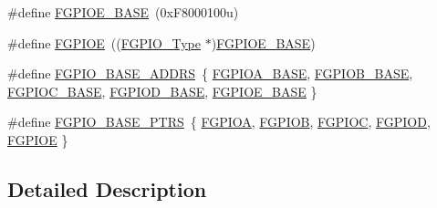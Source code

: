 \begin{DoxyCompactItemize}
\item 
\#define \mbox{\hyperlink{group___f_g_p_i_o___peripheral___access___layer_ga2de7ad1c5fbb15d6ffaecdc3b4653774}{F\+G\+P\+I\+O\+E\+\_\+\+B\+A\+SE}}~(0x\+F8000100u)
\item 
\#define \mbox{\hyperlink{group___f_g_p_i_o___peripheral___access___layer_ga3692c54389ee20cfac5582c942daffc9}{F\+G\+P\+I\+OE}}~((\mbox{\hyperlink{struct_f_g_p_i_o___type}{F\+G\+P\+I\+O\+\_\+\+Type}} $\ast$)\mbox{\hyperlink{group___f_g_p_i_o___peripheral___access___layer_ga2de7ad1c5fbb15d6ffaecdc3b4653774}{F\+G\+P\+I\+O\+E\+\_\+\+B\+A\+SE}})
\item 
\#define \mbox{\hyperlink{group___f_g_p_i_o___peripheral___access___layer_ga4bd60cd4bdf238ff321195acb421b187}{F\+G\+P\+I\+O\+\_\+\+B\+A\+S\+E\+\_\+\+A\+D\+D\+RS}}~\{ \mbox{\hyperlink{group___f_g_p_i_o___peripheral___access___layer_ga5be504106abad77cbd9d7d05bce089bb}{F\+G\+P\+I\+O\+A\+\_\+\+B\+A\+SE}}, \mbox{\hyperlink{group___f_g_p_i_o___peripheral___access___layer_gae82f132d064f5a999cb0191619628cd4}{F\+G\+P\+I\+O\+B\+\_\+\+B\+A\+SE}}, \mbox{\hyperlink{group___f_g_p_i_o___peripheral___access___layer_ga5a8489a84c23b5ff6aae4e0d3048c861}{F\+G\+P\+I\+O\+C\+\_\+\+B\+A\+SE}}, \mbox{\hyperlink{group___f_g_p_i_o___peripheral___access___layer_ga5b3caca7e9c439b235d8390e79731b88}{F\+G\+P\+I\+O\+D\+\_\+\+B\+A\+SE}}, \mbox{\hyperlink{group___f_g_p_i_o___peripheral___access___layer_ga2de7ad1c5fbb15d6ffaecdc3b4653774}{F\+G\+P\+I\+O\+E\+\_\+\+B\+A\+SE}} \}
\item 
\#define \mbox{\hyperlink{group___f_g_p_i_o___peripheral___access___layer_ga58956e4d0a0ffec3e1dd70e77a5160b4}{F\+G\+P\+I\+O\+\_\+\+B\+A\+S\+E\+\_\+\+P\+T\+RS}}~\{ \mbox{\hyperlink{group___f_g_p_i_o___peripheral___access___layer_gae9c9828758a8c2a392181efa5f88ff23}{F\+G\+P\+I\+OA}}, \mbox{\hyperlink{group___f_g_p_i_o___peripheral___access___layer_gab6c2eaacd50ab03a400e2cf6fcff5e62}{F\+G\+P\+I\+OB}}, \mbox{\hyperlink{group___f_g_p_i_o___peripheral___access___layer_ga587b64f3ba8e092c9b25a04c4129c6ae}{F\+G\+P\+I\+OC}}, \mbox{\hyperlink{group___f_g_p_i_o___peripheral___access___layer_ga1a5d3d931f255610ab606286b6f50690}{F\+G\+P\+I\+OD}}, \mbox{\hyperlink{group___f_g_p_i_o___peripheral___access___layer_ga3692c54389ee20cfac5582c942daffc9}{F\+G\+P\+I\+OE}} \}
\end{DoxyCompactItemize}


\subsection{Detailed Description}


